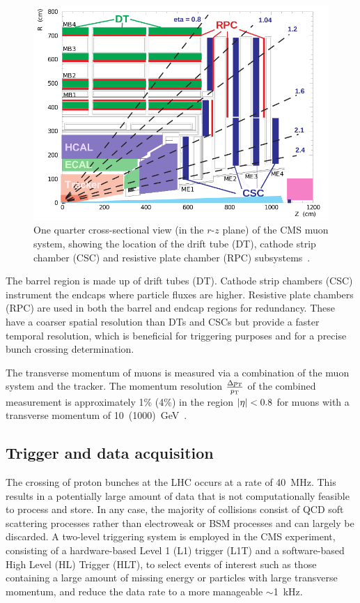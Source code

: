 \begin{figure}
\begin{center}
\includegraphics[width=0.7\linewidth]{figs/detector/muondet}
\end{center}
\caption{One quarter cross-sectional view (in the $r$-$z$ plane) of the CMS 
muon system, showing the location of the drift tube (DT), cathode strip chamber 
(CSC) and resistive plate chamber (RPC) subsystems~\cite{cms}.}
\label{fig:muondet}
\end{figure}

The barrel region is made up of drift tubes (DT). Cathode strip chambers (CSC) 
instrument the endcaps where particle fluxes are higher. Resistive plate 
chambers (RPC) are used in both the barrel and endcap regions for redundancy. 
These have a coarser spatial resolution than DTs and CSCs but provide a faster 
temporal resolution, which is beneficial for triggering purposes and for a 
precise bunch crossing determination.

The transverse momentum of muons is measured via a combination of the muon 
system and the tracker. The momentum resolution $\frac{\Delta{p_{\text T}}}{{p_{\text T}}}$ of the 
combined measurement is approximately 1\% (4\%) in the region $|\eta|<0.8$ for 
muons with a transverse momentum of 10~(1000)~GeV~\cite{cms}.

\subsection{Trigger and data acquisition}
The crossing of proton bunches at the LHC occurs at a rate of 40~MHz. This 
results in a potentially large amount of data that is not computationally 
feasible to process and store. In any case, the majority of collisions consist 
of QCD soft scattering processes rather than electroweak or BSM processes and 
can largely be discarded. A two-level triggering system is employed in the CMS 
experiment, consisting of a hardware-based Level 1 (L1) trigger (L1T) and a 
software-based High Level (HL) Trigger (HLT), to select events of interest such 
as those containing a large amount of missing energy or particles with large 
transverse momentum, and reduce the data rate to a more manageable $\sim$1~kHz.

